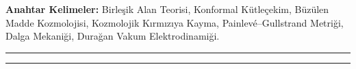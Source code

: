 \documentclass[11pt,a4paper]{article}
\begin{document}
\vspace{1em}
\noindent\textbf{Anahtar Kelimeler:} Birleşik Alan Teorisi, Konformal Kütleçekim, Büzülen Madde Kozmolojisi, Kozmolojik Kırmızıya Kayma, Painlev\'e--Gullstrand Metriği, Dalga Mekaniği, Durağan Vakum Elektrodinamiği.

\vspace{1em}
\hrule
\vspace{0.8em}
\tableofcontents
\vspace{0.8em}
\hrule
\vspace{1.5em}














\end{document}
